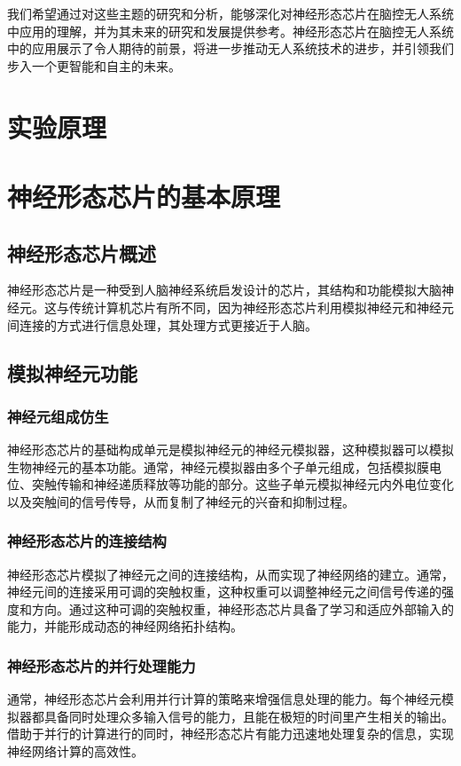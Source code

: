 \documentclass{thuemp}
\begin{document}
我们希望通过对这些主题的研究和分析，能够深化对神经形态芯片在脑控无人系统中应用的理解，并为其未来的研究和发展提供参考。神经形态芯片在脑控无人系统中的应用展示了令人期待的前景，将进一步推动无人系统技术的进步，并引领我们步入一个更智能和自主的未来。


\section{实验原理}

\section{神经形态芯片的基本原理}

\subsection{神经形态芯片概述}
神经形态芯片是一种受到人脑神经系统启发设计的芯片，其结构和功能模拟大脑神经元。这与传统计算机芯片有所不同，因为神经形态芯片利用模拟神经元和神经元间连接的方式进行信息处理，其处理方式更接近于人脑。

\subsection{模拟神经元功能}

\subsubsection{神经元组成仿生}
神经形态芯片的基础构成单元是模拟神经元的神经元模拟器，这种模拟器可以模拟生物神经元的基本功能。通常，神经元模拟器由多个子单元组成，包括模拟膜电位、突触传输和神经递质释放等功能的部分。这些子单元模拟神经元内外电位变化以及突触间的信号传导，从而复制了神经元的兴奋和抑制过程。

\subsubsection{神经形态芯片的连接结构}
神经形态芯片模拟了神经元之间的连接结构，从而实现了神经网络的建立。通常，神经元间的连接采用可调的突触权重，这种权重可以调整神经元之间信号传递的强度和方向。通过这种可调的突触权重，神经形态芯片具备了学习和适应外部输入的能力，并能形成动态的神经网络拓扑结构。

\subsubsection{神经形态芯片的并行处理能力}
通常，神经形态芯片会利用并行计算的策略来增强信息处理的能力。每个神经元模拟器都具备同时处理众多输入信号的能力，且能在极短的时间里产生相关的输出。借助于并行的计算进行的同时，神经形态芯片有能力迅速地处理复杂的信息，实现神经网络计算的高效性。
\end{document}
